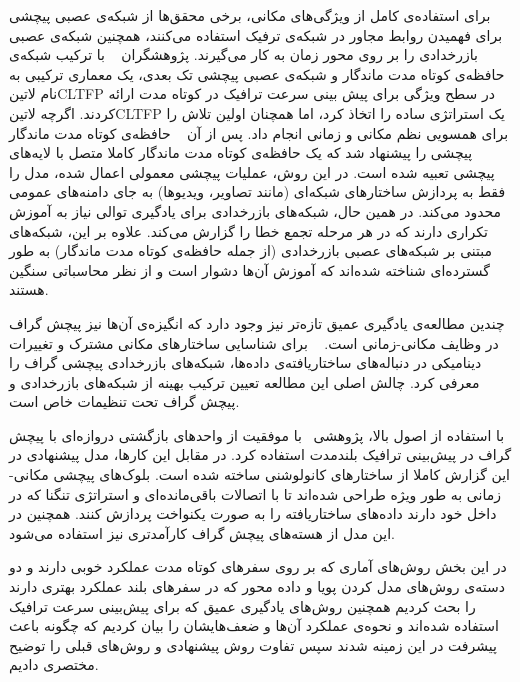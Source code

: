 برای استفاده‌ی کامل از ویژگی‌های مکانی، برخی محقق‌ها از شبکه‌ی عصبی پیچشی برای فهمیدن روابط مجاور در شبکه‌ی ترفیک استفاده می‌کنند،
همچنین شبکه‌ی عصبی بازرخدادی  را بر روی محور زمان به کار می‌گیرند.
پژوهشگران ~ با ترکیب شبکه‌ی حافظه‌ی کوتاه مدت ماندگار و شبکه‌ی عصبی پیچشی تک بعدی، یک معماری ترکیبی به نام ‌لاتین{CLTFP} در سطح ویژگی برای پیش بینی سرعت ترافیک در کوتاه مدت ارائه کردند. اگرچه ‌لاتین{CLTFP} یک استراتژی ساده را اتخاذ کرد، اما همچنان اولین تلاش را برای همسویی نظم مکانی و زمانی انجام داد.
پس از آن ~ حافظه‌ی کوتاه مدت ماندگار پیچشی را پیشنهاد شد که یک حافظه‌ی کوتاه مدت ماندگار کاملا متصل  با لایه‌های پیچشی تعبیه شده است. در این روش، عملیات پیچشی معمولی اعمال شده، مدل را فقط به پردازش ساختارهای شبکه‌ای (مانند تصاویر، ویدیوها) به جای دامنه‌های عمومی محدود می‌کند. در همین حال، شبکه‌های بازرخدادی برای یادگیری توالی نیاز به آموزش تکراری دارند که در هر مرحله تجمع خطا را گزارش می‌کند. علاوه بر این، شبکه‌های مبتنی بر شبکه‌های عصبی بازرخدادی (از جمله حافظه‌ی کوتاه مدت ماندگار) به طور گسترده‌ای شناخته شده‌اند که آموزش آن‌ها دشوار است و از نظر محاسباتی سنگین هستند.

چندین مطالعه‌ی یادگیری عمیق تازه‌تر نیز وجود دارد که انگیزه‌ی آن‌ها نیز پیچش گراف در وظایف مکانی-زمانی است. ~ برای شناسایی ساختارهای مکانی مشترک و تغییرات دینامیکی در دنباله‌های ساختاریافته‌ی داده‌ها، شبکه‌های بازرخدادی پیچشی گراف  را معرفی کرد. چالش اصلی این مطالعه تعیین ترکیب بهینه از شبکه‌های بازرخدادی و پیچش گراف تحت تنظیمات خاص است.

با استفاده از اصول بالا، پژوهشی~ با موفقیت از واحدهای بازگشتی دروازه‌ای  با پیچش گراف در پیش‌بینی ترافیک بلندمدت استفاده کرد. در مقابل این کارها، مدل پیشنهادی در این گزارش کاملا از ساختارهای کانولوشنی ساخته شده است. بلوک‌های پیچشی مکانی-زمانی به طور ویژه طراحی شده‌اند تا با اتصالات باقی‌مانده‌ای و استراتژی تنگنا که در داخل خود دارند داده‌های ساختاریافته را به صورت یکنواخت پردازش کنند. همچنین در این مدل از هسته‌های پیچش گراف کارآمدتری نیز استفاده می‌شود.

در این بخش روش‌های آماری که بر روی سفرهای کوتاه مدت عملکرد خوبی دارند و دو دسته‌ی روش‌های مدل کردن پویا و داده محور که در سفرهای بلند عملکرد بهتری دارند را بحث کردیم همچنین روش‌های یادگیری عمیق که برای پیش‌بینی سرعت ترافیک استفاده شده‌اند و نحوه‌ی عملکرد آن‌ها و ضعف‌هایشان را بیان کردیم که چگونه باعث پیشرفت در این زمینه شدند سپس تفاوت روش پیشنهادی و روش‌های قبلی را توضیح مختصری دادیم.
